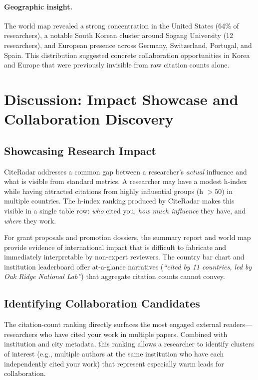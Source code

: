 \documentclass[11pt]{article}
\begin{document}
\paragraph{Geographic insight.}
The world map revealed a strong concentration in the United States (64\% of
researchers), a notable South Korean cluster around Sogang University
(12 researchers), and European presence across Germany, Switzerland,
Portugal, and Spain.
This distribution suggested concrete collaboration opportunities in Korea
and Europe that were previously invisible from raw citation counts alone.


\section{Discussion: Impact Showcase and Collaboration Discovery}
\label{sec:discussion}

\subsection{Showcasing Research Impact}

CiteRadar addresses a common gap between a researcher's \emph{actual}
influence and what is visible from standard metrics.
A researcher may have a modest h-index while having attracted citations from
highly influential groups (h $> 50$) in multiple countries.
The h-index ranking produced by CiteRadar makes this visible in a single
table row: \textit{who} cited you, \textit{how much influence} they have,
and \textit{where} they work.

For grant proposals and promotion dossiers, the summary report and world
map provide evidence of international impact that is difficult to fabricate
and immediately interpretable by non-expert reviewers.
The country bar chart and institution leaderboard offer at-a-glance
narratives (\textit{``cited by 11 countries, led by Oak Ridge National Lab''})
that aggregate citation counts cannot convey.

\subsection{Identifying Collaboration Candidates}

The citation-count ranking directly surfaces the most engaged external
readers—researchers who have cited your work in multiple papers.
Combined with institution and city metadata, this ranking allows a researcher
to identify clusters of interest (e.g., multiple authors at the same
institution who have each independently cited your work) that represent
especially warm leads for collaboration.
\end{document}
